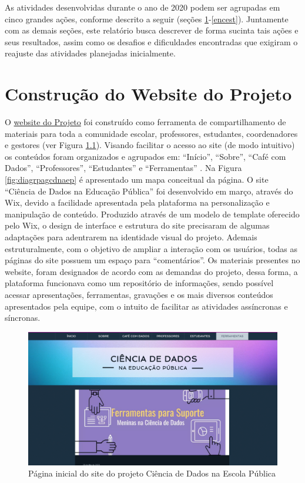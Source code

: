 \documentclass[
]{book}
\begin{document}
As atividades desenvolvidas durante o ano de 2020 podem ser agrupadas em cinco grandes ações, conforme descrito a seguir (seções \ref{website}-\ref{encest}). Juntamente com as demais seções, este relatório busca descrever de forma sucinta tais ações e seus resultados, assim como os desafios e dificuldades encontradas que exigiram o reajuste das atividades planejadas inicialmente.

\hypertarget{website}{%
\chapter{Construção do Website do Projeto}\label{website}}

O \href{https://cienciadedadosep.wixsite.com/cdep/sobre}{website do Projeto} foi construído como ferramenta de compartilhamento de materiais para toda a comunidade escolar, professores, estudantes, coordenadores e gestores (ver Figura \ref{fig:pagcdnaep}). Visando facilitar o acesso ao site (de modo intuitivo) os conteúdos foram organizados e agrupados em: ``Início'', ``Sobre'', ``Café com Dados'', ``Professores'', ``Estudantes'' e ``Ferramentas'' . Na Figura \ref{fig:diagrpagcdnaep} é apresentado um mapa conceitual da página.
O site ``Ciência de Dados na Educação Pública'' foi desenvolvido em março, através do Wix, devido a facilidade apresentada pela plataforma na personalização e manipulação de conteúdo. Produzido através de um modelo de template oferecido pelo Wix, o design de interface e estrutura do site precisaram de algumas adaptações para adentrarem na identidade visual do projeto. Ademais estruturalmente, com o objetivo de ampliar a interação com os usuários, todas as páginas do site possuem um espaço para ``comentários''.
Os materiais presentes no website, foram designados de acordo com as demandas do projeto, dessa forma, a plataforma funcionava como um repositório de informações, sendo possível acessar apresentações, ferramentas, gravações e os mais diversos conteúdos apresentados pela equipe, com o intuito de facilitar as atividades assíncronas e síncronas.

\begin{figure}
\includegraphics[width=26.35in]{images/image85} \caption{Página inicial do site do projeto Ciência de Dados na Escola Pública}\label{fig:pagcdnaep}
\end{figure}
\end{document}

